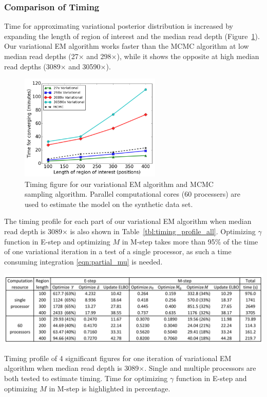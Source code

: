 \documentclass[11pt,reqno]{amsart}
\begin{document}
\subsubsection{Comparison of Timing}
Time for approximating variational posterior distribution is increased by expanding the length of region of interest and the median read depth (Figure~\ref{tbl:timing_mcmc_var}).
Our variational EM algorithm works faster than the MCMC algorithm at low median read depths (27$\times$ and 298$\times$), while it shows the opposite at high median read depths (3089$\times$ and 30590$\times$).
\begin{figure}[ht]
\centering
\includegraphics[width=0.6\textwidth]{figs/timing_var_mcmc.png}
\caption{Timing figure for our variational EM algorithm and MCMC sampling algorithm.
Parallel computational cores (60 processers) are used to estimate the model on the synthetic data set.}
\label{tbl:timing_mcmc_var}
\end{figure}
The timing profile for each part of our variational EM algorithm when median read depth is 3089$\times$ is also shown in Table~\ref{tbl:timing_profile_all}.
Optimizing $\gamma$ function in E-step and optimizing $M$ in M-step takes more than 95\% of the time of one variational iteration in a test of a single processor, as such a time consuming integration \eqref{eqn:partial_mu} is needed.
\begin{table}[htbp]
\centering
\vspace{10pt}
\includegraphics[width=1.0\textwidth]{tables/time_3089X_all_update.png}
\caption{Timing profile of 4 significant figures for one iteration of variational EM algorithm when median read depth is 3089$\times$.
Single and multiple processors are both tested to estimate timing. Time for optimizing $\gamma$ function in E-step and optimizing $M$ in M-step is highlighted in percentage.}
\label{tbl:timing_profile_all}
\end{table}
\end{document}
